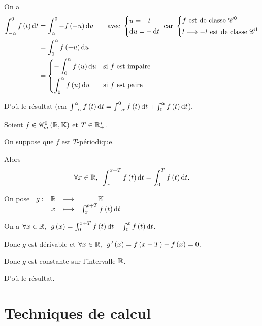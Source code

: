 \begin{dem}
On a \[\begin{aligned}
\int_{-\alpha}^0f\paren{t}\odif{t}&=\int_{\alpha}^0-f\paren{-u}\odif{u}\qquad\text{avec }\begin{dcases}u=-t \\ \odif{u}=-\odif{t}\end{dcases}\text{ car }\begin{dcases}f\text{ est de classe }\classe{0} \\ t\mapsto-t\text{ est de classe }\classe{1}\end{dcases} \\
&=\int_0^{\alpha}f\paren{-u}\odif{u} \\
&=\begin{dcases}-\int_0^{\alpha}f\paren{u}\odif{u} &\text{si }f\text{ est impaire} \\ \int_0^{\alpha}f\paren{u}\odif{u} &\text{si }f\text{  est paire}\end{dcases}
\end{aligned}\]

D'où le résultat (car \(\int_{-\alpha}^{\alpha}f\paren{t}\odif{t}=\int_{-\alpha}^0f\paren{t}\odif{t}+\int_0^{\alpha}f\paren{t}\odif{t}\)).
\end{dem}

\begin{prop}
Soient \(f\in\contm[\R]\) et \(T\in\mathbb{R}_+^*\).

On suppose que \(f\) est \(T\)-périodique.

Alors \[\quantifs{\forall x\in\R}\int_x^{x+T}f\paren{t}\odif{t}=\int_0^Tf\paren{t}\odif{t}.\]
\end{prop}

\begin{dem}
On pose \(\fonction{g}{\R}{\K}{x}{\int_x^{x+T}f\paren{t}\odif{t}}\)

On a \(\quantifs{\forall x\in\R}g\paren{x}=\int_0^{x+T}f\paren{t}\odif{t}-\int_0^xf\paren{t}\odif{t}\).

Donc \(g\) est dérivable et \(\quantifs{\forall x\in\R}g\prim\paren{x}=f\paren{x+T}-f\paren{x}=0\).

Donc \(g\) est constante sur l'intervalle \(\mathbb{R}\).

D'où le résultat.
\end{dem}

\section{Techniques de calcul}

